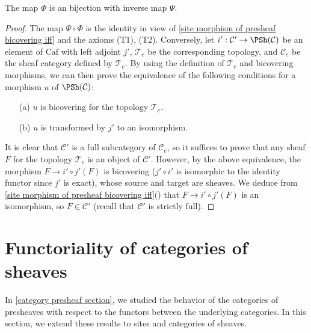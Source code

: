 \begin{theorem}\label{site topology correspond to subcategory}
The map $\Phi$ is an bijection with inverse map $\Psi$.
\end{theorem}
\begin{proof}
The map $\Psi\circ\Phi$ is the identity in view of \cref{site morphism of presheaf bicovering iff} and the axioms (T1), (T2). Conversely, let $i':\mathcal{C}'\to \PSh(\mathcal{C})$ be an element of $\mathrm{Caf}$ with left adjoint $j'$, $\mathcal{T}_e$ be the corresponding topology, and $\mathcal{C}_e$ be the sheaf category defined by $\mathcal{T}_e$. By using the definition of $\mathcal{T}_e$ and bicovering morphisms, we can then prove the equivalence of the following conditions for a morphism $u$ of $\PSh(\mathcal{C})$:
\begin{enumerate}
\item[(a)] $u$ is bicovering for the topology $\mathcal{T}_e$.
\item[(b)] $u$ is transformed by $j'$ to an isomorphism.
\end{enumerate}
It is clear that $\mathcal{C}'$ is a full subcategory of $\mathcal{C}_e$, so it suffices to prove that any sheaf $F$ for the topology $\mathcal{T}_e$ is an object of $\mathcal{C}'$. However, by the above equivalence, the morphism $F\to i'\circ j'(F)$ is bicovering ($j'\circ i'$ is isomorphic to the identity functor since $j'$ is exact), whose source and target are sheaves. We deduce from \cref{site morphism of presheaf bicovering iff}() that $F\to i'\circ j'(F)$ is an isomorphism, so $F\in\mathcal{C}'$ (recall that $\mathcal{C}'$ is strictly full).
\end{proof}
\section{Functoriality of categories of sheaves}
In \autoref{category presheaf section}, we studied the behavior of the categories of presheaves with respect to the functors between the underlying categories. In this section, we extend these results to sites and categories of sheaves.
